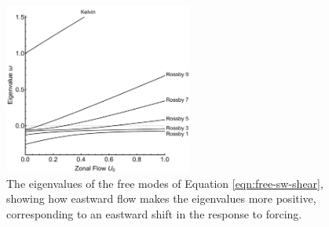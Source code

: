 \begin{figure}
  \centering
  \includegraphics[width=0.55\textwidth]{figures/wave-mean-flow/shear-flow-eval-shift.pdf}
  \caption{The eigenvalues of the free modes of Equation \ref{eqn:free-sw-shear}, showing how eastward flow makes the eigenvalues more positive, corresponding to an eastward shift in the response to forcing.}
  \label{fig:shear-flow-eval-shift}

\vspace*{1.2cm}


\end{figure}
